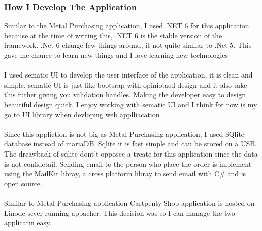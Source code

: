 \documentclass[paper=a4, fontsize=12pt]{scrartcl}
\numberwithin{equation}{section}		%
\numberwithin{figure}{section}			%
\numberwithin{table}{section}				%
\begin{document}
\subsubsection{How I Develop The Application}
Similar to the Metal Purchasing application, I used .NET 6 for this application
because at the time of writing this, .NET 6 is the stable version of the
framework. .Net 6 change few things around, it not quite similar to .Net 5. 
This gave me chance to learn new things and I love learning new technologies
\\
\\
I used sematic UI to develop the user interface of the application, it is 
clean and simple. sematic UI is just like bootsrap with opiniotaed design
and it also take this futher giving you validation handles. Making the developer 
easy to design beautiful design quick. I enjoy working with sematic UI and I 
think for now is my go to UI library when devloping web applliacation
\\
\\
Since this appliction is not big as Metal Purchasing application, I used 
SQlite database instead of mariaDB. Sqlite it is fast simple and can be 
stored on a USB. The dreawback of sqlite dont't opposee a treate for this 
application since the data is not confidetail. Sending email to the person
who place the order is implement using the MailKit libray, a cross platform
libray to send email with C# and is open source.
\\
\\
Similar to Metal Purchasing application Cartpenty Shop application is 
hosted on Linode sever running appacher. This decision was so I can manage the two
applicatin easy.





\end{document}
